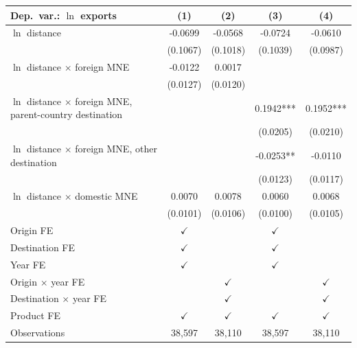 \begin{tabular}{lcccc} \hline
Dep.\ var.: $\ln$ exports & (1) & (2) & (3) & (4) \\ \hline
$\ln$ distance & -0.0699 & -0.0568 & -0.0724 & -0.0610 \\
 & (0.1067) & (0.1018) & (0.1039) & (0.0987) \\
$\ln$ distance $\times$ foreign MNE & -0.0122 & 0.0017 &  &  \\
 & (0.0127) & (0.0120) &  &  \\
$\ln$ distance $\times$ foreign MNE, parent-country destination &  &  & 0.1942*** & 0.1952*** \\
 &  &  & (0.0205) & (0.0210) \\
$\ln$ distance $\times$ foreign MNE, other destination &  &  & -0.0253** & -0.0110 \\
 &  &  & (0.0123) & (0.0117) \\
$\ln$ distance $\times$ domestic MNE & 0.0070 & 0.0078 & 0.0060 & 0.0068 \\
 & (0.0101) & (0.0106) & (0.0100) & (0.0105) \\
\hline
Origin FE & $\checkmark$ &  & $\checkmark$ &  \\
Destination FE & $\checkmark$ &  & $\checkmark$ &  \\
Year FE & $\checkmark$ &  & $\checkmark$ &  \\
Origin $\times$ year FE &  & $\checkmark$ &  & $\checkmark$ \\
Destination $\times$ year FE &  & $\checkmark$ &  & $\checkmark$ \\
Product FE & $\checkmark$ & $\checkmark$ & $\checkmark$ & $\checkmark$ \\
\hline
Observations & 38,597 & 38,110 & 38,597 & 38,110 \\
\hline
\end{tabular}
